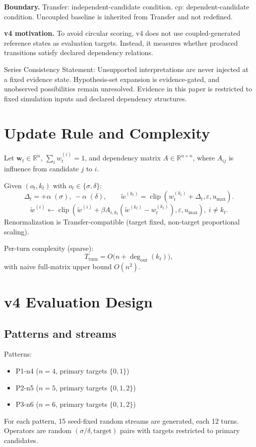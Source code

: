 \documentclass[11pt,a4paper]{article}
\begin{document}
\textbf{Boundary.}
Transfer: independent-candidate condition.
cp: dependent-candidate condition.
Uncoupled baseline is inherited from Transfer and not redefined.

\textbf{v4 motivation.}
To avoid circular scoring, v4 does not use coupled-generated reference states as evaluation targets. Instead, it measures whether produced transitions satisfy declared dependency relations.

Series Consistency Statement: Unsupported interpretations are never injected at a fixed evidence state. Hypothesis-set expansion is evidence-gated, and unobserved possibilities remain unresolved. Evidence in this paper is restricted to fixed simulation inputs and declared dependency structures.

\section{Update Rule and Complexity}
Let \(\mathbf{w}_t\in\mathbb{R}^n\), \(\sum_i w_t^{(i)}=1\), and dependency matrix \(A\in\mathbb{R}^{n\times n}\), where \(A_{ij}\) is influence from candidate \(j\) to \(i\).

Given \((o_t,k_t)\) with \(o_t\in\{\sigma,\delta\}\):
\[
\Delta_t = +\alpha\;(\sigma),\ -\alpha\;(\delta),\qquad
\tilde{w}^{(k_t)}=\operatorname{clip}(w_t^{(k_t)}+\Delta_t,\varepsilon,u_{\max}).
\]
\[
\tilde{w}^{(i)} \leftarrow \operatorname{clip}(\tilde{w}^{(i)}+\beta A_{i,k_t}(\tilde{w}^{(k_t)}-w_t^{(k_t)}),\varepsilon,u_{\max}),\ i\neq k_t.
\]
Renormalization is Transfer-compatible (target fixed, non-target proportional scaling).

Per-turn complexity (sparse):
\[
T_{\text{turn}}=O\big(n+\deg_{\text{out}}(k_t)\big),
\]
with naive full-matrix upper bound \(O(n^2)\).

\section{v4 Evaluation Design}
\subsection{Patterns and streams}
Patterns:
\begin{itemize}
  \item P1-n4 (\(n=4\), primary targets \(\{0,1\}\))
  \item P2-n5 (\(n=5\), primary targets \(\{0,1,2\}\))
  \item P3-n6 (\(n=6\), primary targets \(\{0,1,2\}\))
\end{itemize}
For each pattern, 15 seed-fixed random streams are generated, each 12 turns.
Operators are random \((\sigma/\delta,\text{target})\) pairs with targets restricted to primary candidates.
\end{document}
